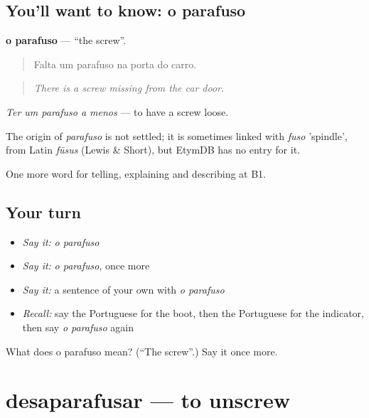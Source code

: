 \subsection*{You'll want to know: o parafuso}
\textbf{o parafuso} — \textquotedblleft{}the screw\textquotedblright{}.

\begin{quote}
Falta um parafuso na porta do carro.
\end{quote}

\begin{quote}
\emph{There is a screw missing from the car door.}
\end{quote}

\emph{Ter um parafuso a menos} — to have a screw loose.

\begin{cousinweb}
The origin of \emph{parafuso} is not settled; it is sometimes linked with \emph{fuso} 'spindle', from Latin \emph{fūsus} (Lewis \& Short), but EtymDB has no entry for it.
\end{cousinweb}

\begin{grammarlens}[title={What you've built}]
One more word for telling, explaining and describing at B1.
\end{grammarlens}

\subsection*{Your turn}
\begin{itemize}
\raggedright
  \item \emph{Say it:} \emph{o parafuso}
  \item \emph{Say it:} \emph{o parafuso}, once more
  \item \emph{Say it:} a sentence of your own with \emph{o parafuso}
  \item \emph{Recall:} say the Portuguese for the boot, then the Portuguese for the indicator, then say \emph{o parafuso} again
\end{itemize}

\begin{tcolorbox}[breakable,colback=teal!4,colframe=teal!35!black,title={Before you move on}]
What does o parafuso mean? (\textquotedblleft{}The screw\textquotedblright{}.) Say it once more.
\end{tcolorbox}
\section[desaparafusar]{desaparafusar — to unscrew}

